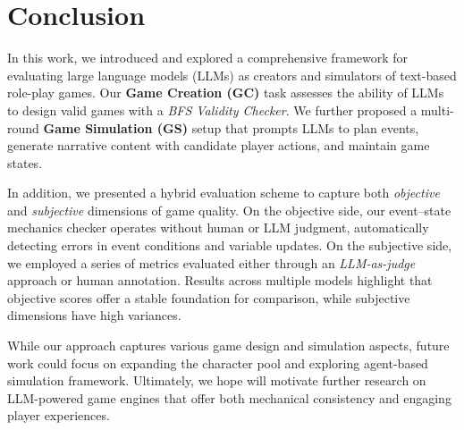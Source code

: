 \section{Conclusion}
In this work, we introduced and explored a comprehensive framework for evaluating large language models (LLMs) as creators and simulators of text-based role-play games. Our \textbf{Game Creation (GC)} task assesses the ability of LLMs to design valid games with a \emph{BFS Validity Checker}. We further proposed a multi-round \textbf{Game Simulation (GS)} setup that prompts LLMs to plan events, generate narrative content with candidate player actions, and maintain game states.  

In addition, we presented a hybrid evaluation scheme to capture both \emph{objective} and \emph{subjective} dimensions of game quality. On the objective side, our event--state mechanics checker operates without human or LLM judgment, automatically detecting errors in event conditions and variable updates. On the subjective side, we employed a series of metrics evaluated either through an \emph{LLM-as-judge} approach or human annotation. Results across multiple models highlight that objective scores offer a stable foundation for comparison, while subjective dimensions have high variances.


While our approach captures various game design and simulation aspects, 
future work could focus on 
expanding the character pool and exploring agent-based simulation framework. Ultimately, we hope \benchmark{} will motivate further research on LLM-powered game engines that offer both mechanical consistency and engaging player experiences.


